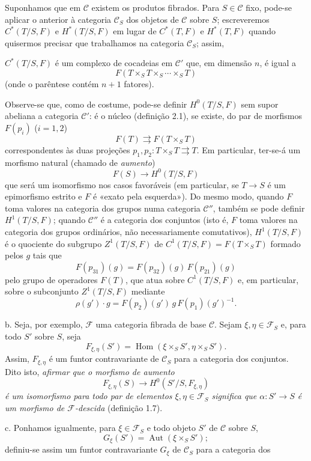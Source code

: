 Suponhamos que em $\mathcal C$ existem os produtos fibrados. Para
$S\in\mathcal C$ fixo, pode-se aplicar o anterior à categoria
$\mathcal C_S$ dos objetos de $\mathcal C$ sobre $S$; escreveremos
$C^*(T/S,F)$ e $H^*(T/S,F)$ em lugar de $C^*(T,F)$ e $H^*(T,F)$ quando
quisermos precisar que trabalhamos na categoria $\mathcal C_S$; assim,

$C^*(T/S,F)$ é um complexo de cocadeias em $\mathcal C'$ que, em dimensão
$n$, é igual a
\[
  F(T\times_ST\times_S\cdots\times_ST)
\]
(onde o parêntese contém $n+1$ fatores).

Observe-se que, como de costume, pode-se definir $H^0(T/S,F)$ sem supor
abeliana a categoria $\mathcal C'$: é o núcleo (definição 2.1), se existe,
do par de morfismos $F(p_i)$ ($i=1,2$)
\[
  F(T)\rightrightarrows F(T\times_ST)
\]
correspondentes às duas projeções
$p_1,p_2:T\times_ST\rightrightarrows T$. Em particular, ter-se-á um morfismo
natural (chamado de \emph{aumento})
\[
  F(S)\longrightarrow H^0(T/S,F)
\]
que será um isomorfismo nos casos favoráveis (em particular, se
$T\longrightarrow S$ é um epimorfismo estrito e $F$ é «exato pela
esquerda»). Do mesmo modo, quando $F$ toma valores na categoria dos
grupos numa categoria $\mathcal C''$, também se pode definir $H^1(T/S,F)$;
quando $\mathcal C''$ é a categoria dos conjuntos (isto é, $F$ toma
valores na categoria dos grupos ordinários, não necessariamente
comutativos), $H^1(T/S,F)$ é o quociente do subgrupo $Z^1(T/S,F)$ de
$C^1(T/S,F)=F(T\times_ST)$ formado pelos $g$ tais que
\[
  F(p_{31})(g)=F(p_{32})(g)\,F(p_{21})(g)
\]
pelo grupo de operadores $F(T)$, que atua sobre $C^1(T/S,F)$ e, em
particular, sobre o subconjunto $Z^1(T/S,F)$ mediante
\[
  \rho(g')\cdot g=F(p_2)(g')\,g\,F(p_1)(g')^{-1}.
\]

\medskip\noindent
b. Seja, por exemplo, $\mathcal F$ uma categoria fibrada de base $\mathcal C$.
Sejam $\xi,\eta\in\mathcal F_S$ e, para todo $S'$ sobre $S$, seja
\[
  F_{\xi,\eta}(S')=
  \operatorname{Hom}(\xi\times_SS',\eta\times_SS').
\]
Assim, $F_{\xi,\eta}$ é um funtor contravariante de $\mathcal C_S$ para a
categoria dos conjuntos. Dito isto, \emph{afirmar que o morfismo de
aumento}
\[
  F_{\xi,\eta}(S)\longrightarrow H^0(S'/S,F_{\xi,\eta})
\]
\emph{é um isomorfismo para todo par de elementos
$\xi,\eta\in\mathcal F_S$ significa que
$\alpha:S'\longrightarrow S$ é um morfismo de $\mathcal F$-descida}
(definição 1.7).

\medskip\noindent
c. Ponhamos igualmente, para $\xi\in\mathcal F_S$ e todo objeto $S'$ de
$\mathcal C$ sobre $S$,
\[
  G_\xi(S')=\operatorname{Aut}(\xi\times_SS') ;
\]
definiu-se assim um funtor contravariante $G_\xi$ de $\mathcal C_S$ para a
categoria dos

